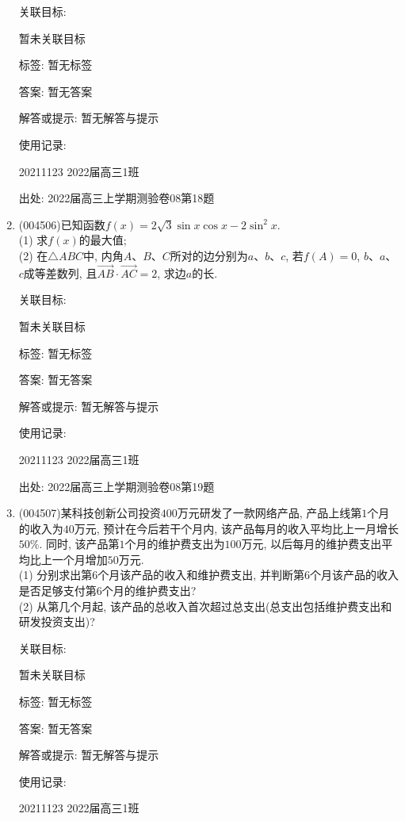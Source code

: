\documentclass[10pt,a4paper]{article}
\begin{document}
\begin{enumerate}[1.]
关联目标:

暂未关联目标



标签: 暂无标签

答案: 暂无答案

解答或提示: 暂无解答与提示

使用记录:

20211123	2022届高三1班		


出处: 2022届高三上学期测验卷08第18题
\item { (004506)}已知函数$f(x)=2\sqrt 3\sin x\cos x-2\sin^2x$.\\
(1) 求$f(x)$的最大值;\\
(2) 在$\triangle ABC$中, 内角$A$、$B$、$C$所对的边分别为$a$、$b$、$c$, 若$f(A)=0$, $b$、$a$、$c$成等差数列, 且$\overrightarrow{AB}\cdot \overrightarrow{AC}=2$, 求边$a$的长.


关联目标:

暂未关联目标



标签: 暂无标签

答案: 暂无答案

解答或提示: 暂无解答与提示

使用记录:

20211123	2022届高三1班		


出处: 2022届高三上学期测验卷08第19题
\item { (004507)}某科技创新公司投资$400$万元研发了一款网络产品, 产品上线第$1$个月的收入为$40$万元, 预计在今后若干个月内, 该产品每月的收入平均比上一月增长$50\%$. 同时, 该产品第$1$个月的维护费支出为$100$万元, 以后每月的维护费支出平均比上一个月增加$50$万元.\\
(1)	分别求出第$6$个月该产品的收入和维护费支出, 并判断第$6$个月该产品的收入是否足够支付第$6$个月的维护费支出?\\
(2)	从第几个月起, 该产品的总收入首次超过总支出(总支出包括维护费支出和研发投资支出)?


关联目标:

暂未关联目标



标签: 暂无标签

答案: 暂无答案

解答或提示: 暂无解答与提示

使用记录:

20211123	2022届高三1班			



\end{enumerate}
\end{document}
